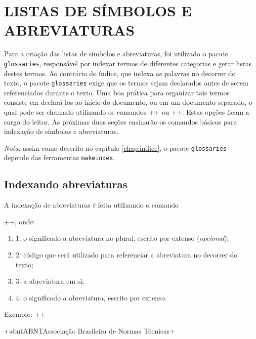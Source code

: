 \documentclass{fei}
\begin{document}
	\chapter{LISTAS DE SÍMBOLOS E ABREVIATURAS} \label{chap:listas}
	
	Para a criação das listas de símbolos e abreviaturas, foi utilizado o pacote \texttt{glossaries}, responsável por indexar termos de diferentes categorias e gerar listas destes termos. Ao contrário do índice, que indexa as palavras no decorrer do texto, o pacote \texttt{glossaries} exige que os termos sejam declarados antes de serem referenciados durante o texto. Uma boa prática para organizar tais termos consiste em declará-los ao início do documento, ou em um documento separado, o qual pode ser chamado utilizando os comandos \latexinline++ ou \latexinline++. Estas opções ficam a cargo do leitor. As próximas duas seções ensinarão os comandos básicos para indexação de símbolos e abreviaturas.
	
	\emph{Nota:} assim como descrito no capítulo \ref{chap:indice}, o pacote \texttt{glossaries} depende das ferramentas \texttt{makeindex}.
	
	\section{Indexando abreviaturas}
	
	A indexação de abreviaturas é feita utilizando o comando
	
	\latexinline++, onde:
	
	\begin{enumerate}
	\item 1: o significado a abreviatura no plural, escrito por extenso (\emph{opcional});
	\item 2: código que será utilizado para referenciar a abreviatura no decorrer do texto;
	\item 3: a abreviatura em si;
	\item 4: o significado a abreviatura, escrito por extenso.
	\end{enumerate}
	
	Exemplo: \latexinline+\newacronym[longplural=Associações+
	
			 \latexinline+Brasileiras de Normas Técnicas]+
			 
			 \latexinline+{abnt}{ABNT}{Associação Brasileira de Normas Técnicas}+
			 
\end{document}
